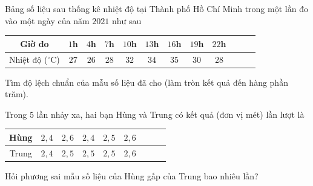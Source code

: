\begin{bt}%
	Bảng  số liệu sau thống kê nhiệt độ tại Thành phố Hồ Chí Minh trong một lần đo vào một ngày của năm $2021$ như sau
	\begin{center}
		\begin{tabular}{|c|c|c|c|c|c|c|c|c|c|c|c}
			\hline  Giờ đo & $1$h & $4$h & $7$h & $10$h & $13$h & $16$h & $19$h & $22$h \\
			\hline Nhiệt độ ($^\circ \mathrm{C}$) & $27$ & $26$  & $28$ & $32$ & $34$ & $35$ & $30$ & $28$ \\
			 \hline
		\end{tabular}
	\end{center}
	Tìm độ lệch chuẩn của  mẫu số liệu đã cho (làm tròn kết quả đến hàng phần trăm).
\end{bt}

\begin{bt}%
	Trong $5$ lần nhảy xa, hai bạn Hùng và Trung có kết quả (đơn vị mét) lần lượt  là
	\begin{center}
		\begin{tabular}{|c|c|c|c|c|c|c|c|c|}
			\hline Hùng & $2{,}4$ & $2{,}6$ & $2{,}4$ & $2{,}5$ &  $2{,}6$ \\
			\hline Trung &  $2{,}4$ & $2{,}5$ & $2{,}5$ & $2{,}5$ & $2{,}6$ \\
			\hline 
		\end{tabular}
	\end{center}
	 Hỏi phương sai mẫu số liệu của Hùng gấp của Trung bao nhiêu lần?
\end{bt}

